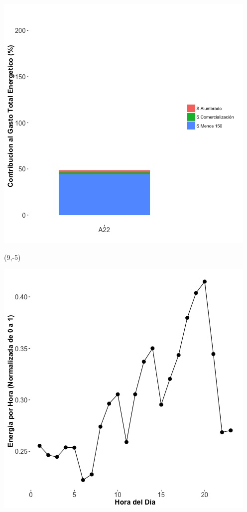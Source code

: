 \documentclass{article}\usepackage[]{graphicx}\usepackage[]{color}
\newenvironment{knitrout}{}{} %
\begin{document}
\begin{knitrout}
\color{fgcolor}
\includegraphics[scale=0.65]{figure/A22_subvars_plot.jpg} 
\end{knitrout}

 \begin{textblock}{1}(9,-5)
\begin{minipage}{20em}
\begingroup

\endgroup
\end{minipage}
\end{textblock}

\begin{knitrout}
\color{fgcolor}
\includegraphics[scale=0.65]{figure/A22_plot_norm_median} 
\end{knitrout}
\end{document}
